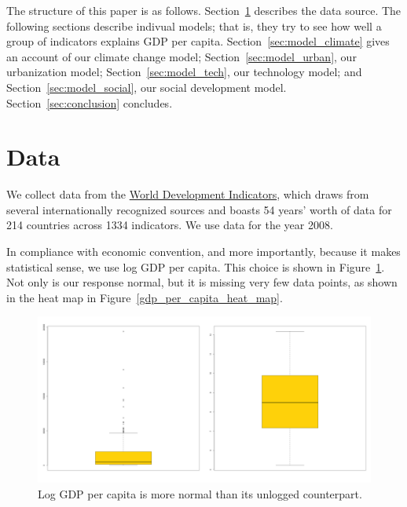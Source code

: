 \documentclass[11pt]{article}
\begin{document}
The structure of this paper is as follows.
Section~\ref{sec:data} describes the data source.
The following sections describe indivual models; that is, they try to see how well a group of indicators explains GDP per capita.
Section~\ref{sec:model_climate} gives an account of our climate change model;
Section~\ref{sec:model_urban}, our urbanization model;
Section~\ref{sec:model_tech}, our technology model; and
Section~\ref{sec:model_social}, our social development model.
Section~\ref{sec:conclusion} concludes.






\section{Data}
\label{sec:data}
We collect data from the \href{http://data.worldbank.org/indicator}{World Development Indicators}, 
which draws from several internationally recognized sources and boasts 54 years' worth of data for 214 countries across 1334 indicators.
We use data for the year 2008.\endnotemark[1]

In compliance with economic convention, and more importantly, because it makes statistical sense, we use log GDP per capita. This choice is shown in Figure~\ref{gdp_transform}. Not only is our response normal, but it is missing very few data points, as shown in the heat map in Figure~\ref{gdp_per_capita_heat_map}.

\begin{figure}[!ht]
  \centering
  \includegraphics[width=\textwidth]{images/gdp_transform}
  \caption{\label{gdp_transform}Log GDP per capita is more normal than its unlogged counterpart.}
\end{figure}
\end{document}
